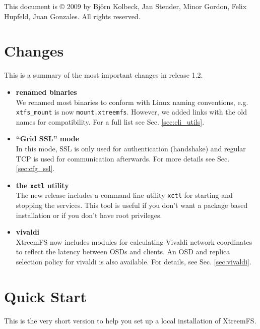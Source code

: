 \documentclass[a4paper,10pt]{book}
\begin{document}
This document is \copyright{} 2009 by Bj\"orn Kolbeck, Jan Stender, Minor Gordon, Felix Hupfeld, Juan Gonzales. All rights reserved.

\setcounter{tocdepth}{10}
\tableofcontents

\chapter*{Changes}

This is a summary of the most important changes in release 1.2.

\begin{itemize}
 \item \textbf{renamed binaries}\\
 We renamed most binaries to conform with Linux naming conventions, e.g. \texttt{xtfs\_mount} is now \texttt{mount.xtreemfs}. However, we added links with the old names for compatibility. For a full list see Sec. \ref{sec:cli_utils}. 

 \item \textbf{``Grid SSL'' mode}\\
 In this mode, SSL is only used for authentication (handshake) and regular TCP is used for communication afterwards. For more details see Sec. \ref{sec:cfg_ssl}.

 \item \textbf{the \texttt{xctl} utility}\\
 The new release includes a command line utility \texttt{xctl} for starting and stopping the services. This tool is useful if you don't want a package based installation or if you don't have root privileges.

 \item \textbf{vivaldi}\\
 XtreemFS now includes modules for calculating Vivaldi network coordinates to reflect the latency between OSDs and clients. An OSD and replica selection policy for vivaldi is also available. For details, see Sec. \ref{sec:vivaldi}.

\end{itemize}


\chapter{Quick Start}

This is the very short version to help you set up a local installation of XtreemFS.
\end{document}
